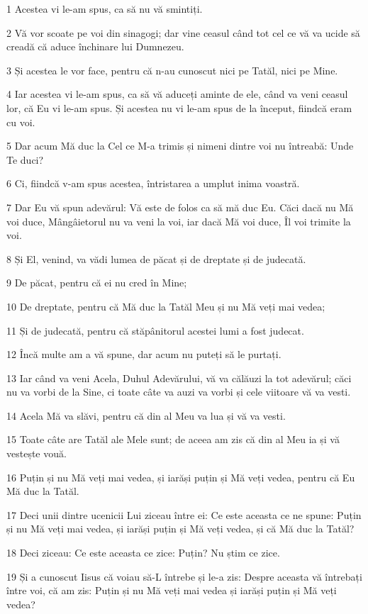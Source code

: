 \par 1 Acestea vi le-am spus, ca să nu vă smintiți.
\par 2 Vă vor scoate pe voi din sinagogi; dar vine ceasul când tot cel ce vă va ucide să creadă că aduce închinare lui Dumnezeu.
\par 3 Și acestea le vor face, pentru că n-au cunoscut nici pe Tatăl, nici pe Mine.
\par 4 Iar acestea vi le-am spus, ca să vă aduceți aminte de ele, când va veni ceasul lor, că Eu vi le-am spus. Și acestea nu vi le-am spus de la început, fiindcă eram cu voi.
\par 5 Dar acum Mă duc la Cel ce M-a trimis și nimeni dintre voi nu întreabă: Unde Te duci?
\par 6 Ci, fiindcă v-am spus acestea, întristarea a umplut inima voastră.
\par 7 Dar Eu vă spun adevărul: Vă este de folos ca să mă duc Eu. Căci dacă nu Mă voi duce, Mângâietorul nu va veni la voi, iar dacă Mă voi duce, Îl voi trimite la voi.
\par 8 Și El, venind, va vădi lumea de păcat și de dreptate și de judecată.
\par 9 De păcat, pentru că ei nu cred în Mine;
\par 10 De dreptate, pentru că Mă duc la Tatăl Meu și nu Mă veți mai vedea;
\par 11 Și de judecată, pentru că stăpânitorul acestei lumi a fost judecat.
\par 12 Încă multe am a vă spune, dar acum nu puteți să le purtați.
\par 13 Iar când va veni Acela, Duhul Adevărului, vă va călăuzi la tot adevărul; căci nu va vorbi de la Sine, ci toate câte va auzi va vorbi și cele viitoare vă va vesti.
\par 14 Acela Mă va slăvi, pentru că din al Meu va lua și vă va vesti.
\par 15 Toate câte are Tatăl ale Mele sunt; de aceea am zis că din al Meu ia și vă vestește vouă.
\par 16 Puțin și nu Mă veți mai vedea, și iarăși puțin și Mă veți vedea, pentru că Eu Mă duc la Tatăl.
\par 17 Deci unii dintre ucenicii Lui ziceau între ei: Ce este aceasta ce ne spune: Puțin și nu Mă veți mai vedea, și iarăși puțin și Mă veți vedea, și că Mă duc la Tatăl?
\par 18 Deci ziceau: Ce este aceasta ce zice: Puțin? Nu știm ce zice.
\par 19 Și a cunoscut Iisus că voiau să-L întrebe și le-a zis: Despre aceasta vă întrebați între voi, că am zis: Puțin și nu Mă veți mai vedea și iarăși puțin și Mă veți vedea?
